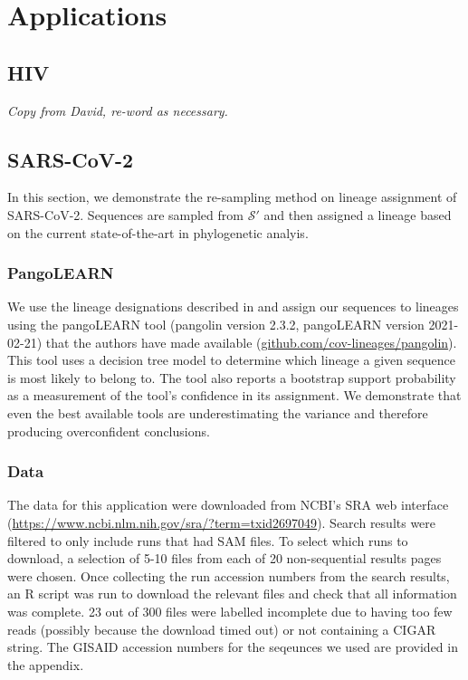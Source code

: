 \documentclass[
]{article}
\newcommand{\nps}{\mathcal{S}} %
\begin{document}
\hypertarget{applications}{%
\section{Applications}\label{applications}}

\hypertarget{hiv}{%
\subsection{HIV}\label{hiv}}

\emph{Copy from David, re-word as necessary.}

\hypertarget{sars-cov-2}{%
\subsection{SARS-CoV-2}\label{sars-cov-2}}

In this section, we demonstrate the re-sampling method on lineage
assignment of SARS-CoV-2. Sequences are sampled from \(\nps'\) and then
assigned a lineage based on the current state-of-the-art in phylogenetic
analyis.

\hypertarget{pangolearn}{%
\subsubsection{PangoLEARN}\label{pangolearn}}

We use the lineage designations described in
\citet{rambautDynamicNomenclatureProposal2020} and assign our sequences
to lineages using the pangoLEARN tool (pangolin version 2.3.2,
pangoLEARN version 2021-02-21) that the authors have made available
(\url{github.com/cov-lineages/pangolin}). This tool uses a decision tree
model to determine which lineage a given sequence is most likely to
belong to. The tool also reports a bootstrap support probability as a
measurement of the tool's confidence in its assignment. We demonstrate
that even the best available tools are underestimating the variance and
therefore producing overconfident conclusions.

\hypertarget{data}{%
\subsubsection{Data}\label{data}}

The data for this application were downloaded from NCBI's SRA web
interface (\url{https://www.ncbi.nlm.nih.gov/sra/?term=txid2697049}).
Search results were filtered to only include runs that had SAM files. To
select which runs to download, a selection of 5-10 files from each of 20
non-sequential results pages were chosen. Once collecting the run
accession numbers from the search results, an R script was run to
download the relevant files and check that all information was complete.
23 out of 300 files were labelled incomplete due to having too few reads
(possibly because the download timed out) or not containing a CIGAR
string. The GISAID accession numbers for the seqeunces we used are
provided in the appendix.
\end{document}
